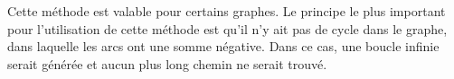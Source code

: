 \documentclass[11pt]{article}
\begin{document}
\begin{enumerate}
Cette méthode est valable pour certains graphes. Le principe le plus important pour l'utilisation de cette méthode est qu'il n'y ait pas de cycle dans le graphe, dans laquelle les arcs ont une somme négative. Dans ce cas, une boucle infinie serait générée et aucun plus long chemin ne serait trouvé.

\end{enumerate}
\end{document}
